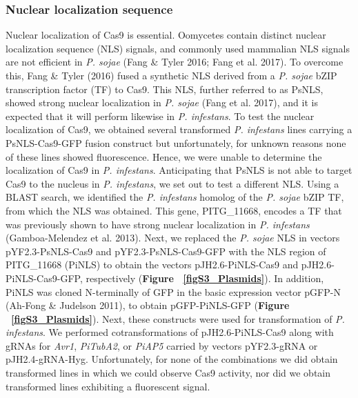 \documentclass[onecolumn, 11pt,openany]{memoir}
\begin{document}
\begin{multicols}{2}
\subsubsection{Nuclear localization sequence}
Nuclear localization of Cas9 is essential. Oomycetes contain distinct nuclear localization sequence (NLS) signals, and commonly used mammalian NLS signals are not efficient in \textit{P. sojae }(Fang \& Tyler 2016; Fang et al. 2017). To overcome this, Fang \& Tyler (2016) fused a synthetic NLS derived from a \textit{P. sojae} bZIP transcription factor (TF) to Cas9. This NLS, further referred to as PsNLS, showed strong nuclear localization in \textit{P. sojae} (Fang et al. 2017), and it is expected that it will perform likewise in \textit{P. infestans}. To test the nuclear localization of Cas9, we obtained several transformed \textit{P. infestans} lines carrying a PsNLS-Cas9-GFP fusion construct but unfortunately, for unknown reasons none of these lines showed fluorescence. Hence, we were unable to determine the localization of Cas9 in \textit{P. infestans}. Anticipating that PsNLS is not able to target Cas9 to the nucleus in \textit{P. infestans}, we set out to test a different NLS. Using a BLAST search, we identified the \textit{P. infestans} homolog of the \textit{P. sojae }bZIP TF, from which the NLS was obtained. This gene, PITG\_11668, encodes a TF that was previously shown to have strong nuclear localization in \textit{P. infestans} (Gamboa-Melendez et al. 2013). Next, we replaced the \textit{P. sojae} NLS in vectors pYF2.3-PsNLS-Cas9 and pYF2.3-PsNLS-Cas9-GFP with the NLS region of PITG\_11668 (PiNLS) to obtain the vectors pJH2.6-PiNLS-Cas9 and pJH2.6-PiNLS-Cas9-GFP, respectively (\textbf{Figure ~\ref{figS3_Plasmids}}). In addition, PiNLS was cloned N-terminally of GFP in the basic expression vector pGFP-N (Ah-Fong \& Judelson 2011), to obtain pGFP-PiNLS-GFP (\textbf{Figure ~\ref{figS3_Plasmids}}). Next, these constructs were used for transformation of \textit{P. infestans}. We performed cotransformations of pJH2.6-PiNLS-Cas9 along with gRNAs for \textit{Avr1}, \textit{PiTubA2}, or \textit{PiAP5} carried by vectors pYF2.3-gRNA or pJH2.4-gRNA-Hyg. Unfortunately, for none of the combinations we did obtain transformed lines in which we could observe Cas9 activity, nor did we obtain transformed lines exhibiting a fluorescent signal.


\end{multicols}
\end{document}

